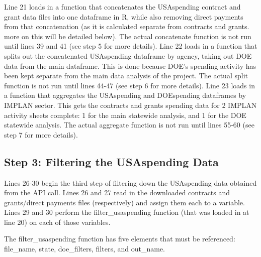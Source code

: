 \documentclass[
]{book}
\begin{document}
Line 21 loads in a function that concatenates the USAspending contract and grant data files into one dataframe in R, while also removing direct payments from that concatenation (as it is calculated separate from contracts and grants. more on this will be detailed below). The actual concatenate function is not run until lines 39 and 41 (see step 5 for more details). Line 22 loads in a function that splits out the concatenated USAspending dataframe by agency, taking out DOE data from the main dataframe. This is done because DOE's spending activity has been kept separate from the main data analysis of the project. The actual split function is not run until lines 44-47 (see step 6 for more details). Line 23 loads in a function that aggregates the USAspending and DOEspending dataframes by IMPLAN sector. This gets the contracts and grants spending data for 2 IMPLAN activity sheets complete: 1 for the main statewide analysis, and 1 for the DOE statewide analysis. The actual aggregate function is not run until lines 55-60 (see step 7 for more details).

\hypertarget{step-3-filtering-the-usaspending-data}{%
\subsection{Step 3: Filtering the USAspending Data}\label{step-3-filtering-the-usaspending-data}}

Lines 26-30 begin the third step of filtering down the USAspending data obtained from the API call. Lines 26 and 27 read in the downloaded contracts and grants/direct payments files (respectively) and assign them each to a variable. Lines 29 and 30 perform the filter\_usaspending function (that was loaded in at line 20) on each of those variables.

The filter\_usaspending function has five elements that must be referenced: file\_name, state, doe\_filters, filters, and out\_name.
\end{document}
